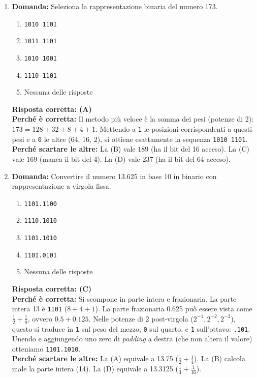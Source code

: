 \documentclass[12pt, a4paper]{article}
\begin{document}
\begin{enumerate}
    \item \textbf{Domanda:} Seleziona la rappresentazione binaria del numero 173.
    \begin{enumerate}[label=(\Alph*)]
        \item \texttt{1010 1101}
        \item \texttt{1011 1101}
        \item \texttt{1010 1001}
        \item \texttt{1110 1101}
        \item Nessuna delle risposte
    \end{enumerate}
    \textbf{Risposta corretta: (A)} \\
    \textbf{Perché è corretta:} Il metodo più veloce è la somma dei pesi (potenze di 2): $173 = 128 + 32 + 8 + 4 + 1$. Mettendo a \texttt{1} le posizioni corrispondenti a questi pesi e a \texttt{0} le altre (64, 16, 2), si ottiene esattamente la sequenza \texttt{1010 1101}. \\
    \textbf{Perché scartare le altre:} La (B) vale $189$ (ha il bit del 16 acceso). La (C) vale $169$ (manca il bit del 4). La (D) vale $237$ (ha il bit del 64 acceso).

    \item \textbf{Domanda:} Convertire il numero 13.625 in base 10 in binario con rappresentazione a virgola fissa.
    \begin{enumerate}[label=(\Alph*)]
        \item \texttt{1101.1100}
        \item \texttt{1110.1010}
        \item \texttt{1101.1010}
        \item \texttt{1101.0101}
        \item Nessuna delle risposte
    \end{enumerate}
    \textbf{Risposta corretta: (C)} \\
    \textbf{Perché è corretta:} Si scompone in parte intera e frazionaria. La parte intera 13 è \texttt{1101} ($8+4+1$). La parte frazionaria 0.625 può essere vista come $\frac{1}{2} + \frac{1}{8}$, ovvero $0.5 + 0.125$. Nelle potenze di 2 post-virgola ($2^{-1}, 2^{-2}, 2^{-3}$), questo si traduce in \texttt{1} sul peso del mezzo, \texttt{0} sul quarto, e \texttt{1} sull'ottavo: \texttt{.101}. Unendo e aggiungendo uno zero di \textit{padding} a destra (che non altera il valore) otteniamo \texttt{1101.1010}. \\
    \textbf{Perché scartare le altre:} La (A) equivale a 13.75 ($\frac{1}{2} + \frac{1}{4}$). La (B) calcola male la parte intera (14). La (D) equivale a 13.3125 ($\frac{1}{4} + \frac{1}{16}$).


\end{enumerate}
\end{document}
